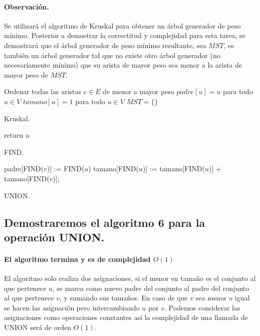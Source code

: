 \documentclass[12pt]{article}
\begin{document}
\paragraph{Observación.} Se utilizará el algoritmo de Kruskal para obtener un árbol generador de peso mínimo. Posterior a demostrar la correctitud y complejidad para esta tarea, se demostrará que el árbol generador de peso mínimo resultante, sea $MST$, es también un árbol generador tal que no existe otro árbol generador (no necesariamente mínimo) que su arista de mayor peso sea menor a la arista de mayor peso de $MST$.\\
\begin{algorithm}[H]\footnotesize
	\SetAlgoLined
	Ordenar todas las aristas $e \in E$ de menor a mayor peso\;
	$padre[u]=u$ para todo $u\in V$\;
	$tamano[u]=1$ para todo $u\in V$\;
	$MST = \{\}$\;
	\caption{Kruskal.}
\end{algorithm}
\begin{algorithm}[H]\footnotesize
	\SetAlgoLined
	return $u$\;
	\caption{FIND.}
\end{algorithm}
\begin{algorithm}[H]\footnotesize
	\SetAlgoLined
	 {
	padre[FIND($v$)] := FIND($u$)\;
	tamano[FIND($u$)] := tamano[FIND($u$)] + tamano[FIND($v$)];
	}
	\caption{UNION.}
\end{algorithm}
\subsection{Demostraremos el algoritmo 6 para la operación UNION.}
\paragraph{El algoritmo termina y es de complejidad $O(1)$} El algoritmo solo realiza dos asignaciones, si el menor en tamaño es el conjunto al que pertenece $u$, se marca como nuevo padre del conjunto al padre del conjunto al que pertenece $v$, y sumando sus tamaños. En caso de que $v$ sea menor o igual se hacen las asignación pero intercambiando $u$ por $v$. Podemos considerar las asignaciones como operaciones constantes así la complejidad de una llamada de UNION será de orden $O(1)$.
\end{document}
